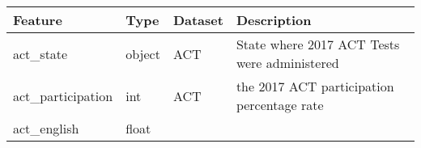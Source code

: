 \documentclass[11pt]{article}
\begin{document}
\begin{longtable}[]{@{}llll@{}}
\toprule
\begin{minipage}[b]{0.05\columnwidth}\raggedright\strut
Feature\strut
\end{minipage} & \begin{minipage}[b]{0.05\columnwidth}\raggedright\strut
Type\strut
\end{minipage} & \begin{minipage}[b]{0.05\columnwidth}\raggedright\strut
Dataset\strut
\end{minipage} & \begin{minipage}[b]{0.05\columnwidth}\raggedright\strut
Description\strut
\end{minipage}\tabularnewline
\midrule
\endhead
\begin{minipage}[t]{0.05\columnwidth}\raggedright\strut
act\_state\strut
\end{minipage} & \begin{minipage}[t]{0.05\columnwidth}\raggedright\strut
object\strut
\end{minipage} & \begin{minipage}[t]{0.05\columnwidth}\raggedright\strut
ACT\strut
\end{minipage} & \begin{minipage}[t]{0.05\columnwidth}\raggedright\strut
State where 2017 ACT Tests were administered\strut
\end{minipage}\tabularnewline
\begin{minipage}[t]{0.05\columnwidth}\raggedright\strut
act\_participation\strut
\end{minipage} & \begin{minipage}[t]{0.05\columnwidth}\raggedright\strut
int\strut
\end{minipage} & \begin{minipage}[t]{0.05\columnwidth}\raggedright\strut
ACT\strut
\end{minipage} & \begin{minipage}[t]{0.05\columnwidth}\raggedright\strut
the 2017 ACT participation percentage rate\strut
\end{minipage}\tabularnewline
\begin{minipage}[t]{0.05\columnwidth}\raggedright\strut
act\_english\strut
\end{minipage} & \begin{minipage}[t]{0.05\columnwidth}\raggedright\strut
float\strut
\end{minipage} & \begin{minipage}[t]{0.05\columnwidth}\raggedright\strut

\end{minipage}
\end{longtable}
\end{document}
